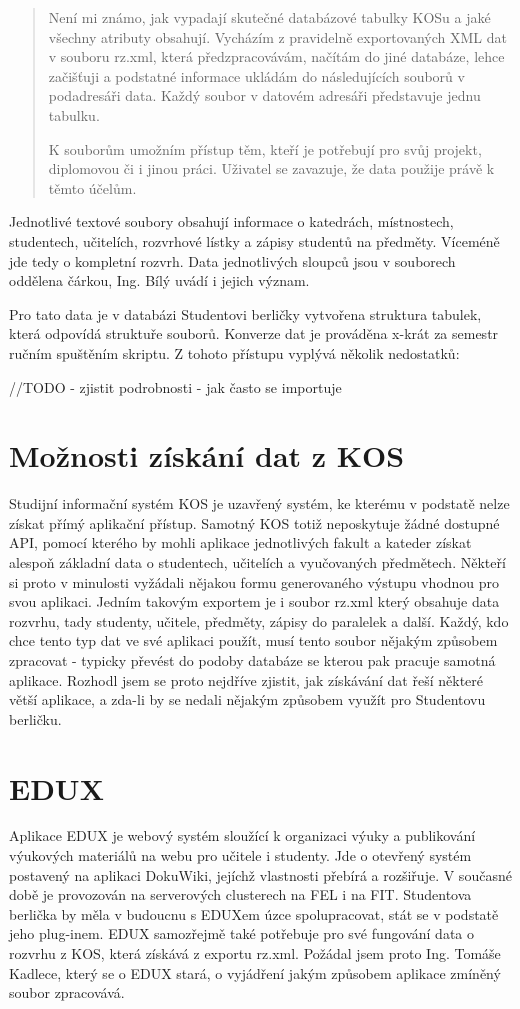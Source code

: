 \documentclass[11pt,twoside,a4paper]{book}
\begin{document}
\begin{quotation}
Není mi známo, jak vypadají skutečné databázové tabulky KOSu a jaké všechny atributy obsahují. Vycházím z pravidelně exportovaných XML dat v souboru rz.xml, která předzpracovávám, načítám do jiné databáze, lehce začišťuji a podstatné informace ukládám do následujících souborů v podadresáři data. Každý soubor v datovém adresáři představuje jednu tabulku.

K souborům umožním přístup těm, kteří je potřebují pro svůj projekt, diplomovou či i jinou práci. Uživatel se zavazuje, že data použije právě k těmto účelům.
\end{quotation}

Jednotlivé textové soubory obsahují informace o katedrách, místnostech, studentech, učitelích, rozvrhové lístky a zápisy studentů na předměty. Víceméně jde tedy o kompletní rozvrh. Data jednotlivých sloupců jsou v souborech oddělena čárkou, Ing. Bílý uvádí i jejich význam.

Pro tato data je v databázi Studentovi berličky vytvořena struktura tabulek, která odpovídá struktuře souborů. Konverze dat je prováděna x-krát za semestr ručním spuštěním skriptu. Z tohoto přístupu vyplývá několik nedostatků:


//TODO - zjistit podrobnosti - jak často se importuje


\section{Možnosti získání dat z KOS}

Studijní informační systém KOS je uzavřený systém, ke kterému v podstatě nelze získat přímý aplikační přístup. Samotný KOS totiž neposkytuje žádné dostupné API, pomocí kterého by mohli aplikace jednotlivých fakult a kateder získat alespoň základní data o studentech, učitelích a vyučovaných předmětech. Někteří si proto v minulosti vyžádali nějakou formu generovaného výstupu vhodnou pro svou aplikaci. Jedním takovým exportem je i soubor rz.xml který obsahuje data rozvrhu, tady studenty, učitele, předměty, zápisy do paralelek a další. Každý, kdo chce tento typ dat ve své aplikaci použít, musí tento soubor nějakým způsobem zpracovat - typicky převést do podoby databáze se kterou pak pracuje samotná aplikace. Rozhodl jsem se proto nejdříve zjistit, jak získávání dat řeší některé větší aplikace, a zda-li by se nedali nějakým způsobem využít pro Studentovu berličku.

\section{EDUX}
Aplikace EDUX je webový systém sloužící k organizaci výuky a publikování výukových materiálů na webu pro učitele i studenty. Jde o otevřený systém postavený na aplikaci DokuWiki, jejíchž vlastnosti přebírá a rozšiřuje. V současné době je provozován na serverových clusterech na FEL i na FIT. Studentova berlička by měla v budoucnu s EDUXem úzce spolupracovat, stát se v podstatě jeho plug-inem. EDUX samozřejmě také potřebuje pro své fungování data o rozvrhu z KOS, která získává z exportu rz.xml. Požádal jsem proto Ing. Tomáše Kadlece, který se o EDUX stará, o vyjádření jakým způsobem aplikace zmíněný soubor zpracovává.
\end{document}
